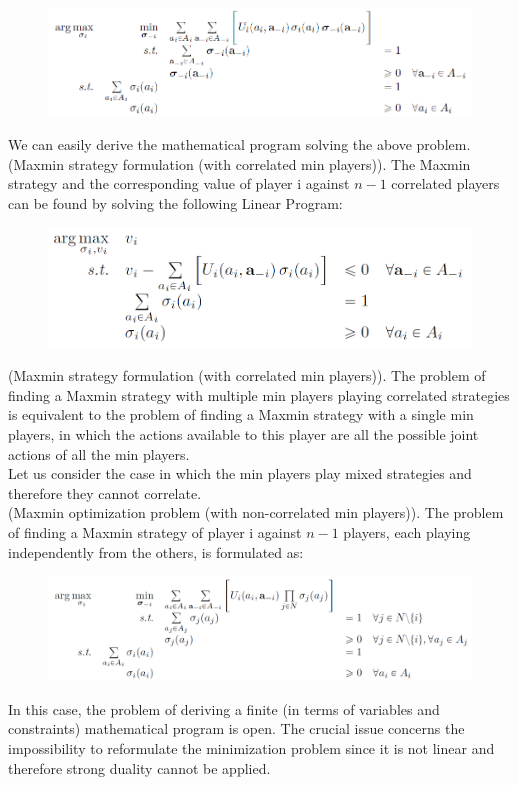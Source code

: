 \begin{figure}[H]
\centering
\includegraphics[width=\textwidth]{images/img_2_9_04.png}
\end{figure}
\noindent
We can easily derive the mathematical program solving the above problem.\\
(Maxmin strategy formulation (with correlated min players)). The Maxmin strategy and the corresponding value of player i against $n-1$ correlated players can be found by solving the following Linear Program:
\begin{figure}[H]
\centering
\includegraphics[width=\textwidth]{images/img_2_9_05.png}
\end{figure}
\noindent
(Maxmin strategy formulation (with correlated min players)). The problem of finding a Maxmin strategy with multiple min players playing correlated strategies is equivalent to the problem of finding a Maxmin strategy with a single min players, in which the actions available to this player are all the possible joint actions of all the min players.\\
Let us consider the case in which the min players play mixed strategies and therefore they cannot correlate.\\
(Maxmin optimization problem (with non-correlated min players)). The problem of finding a Maxmin strategy of player i against $n-1$ players, each playing independently from the others, is formulated
as:
\begin{figure}[H]
\centering
\includegraphics[width=\textwidth]{images/img_2_9_06.png}
\end{figure}
\noindent
In this case, the problem of deriving a finite (in terms of variables and constraints) mathematical program
is open. The crucial issue concerns the impossibility to reformulate the minimization problem since it is not
linear and therefore strong duality cannot be applied.
